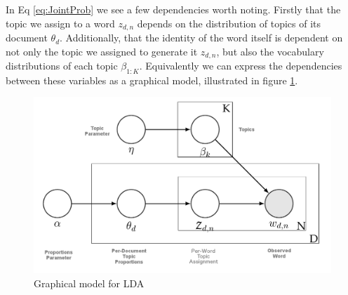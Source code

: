 In Eq \ref{eq:JointProb} we see a few dependencies worth noting. Firstly that the topic we assign to a word $z_{d,n}$ depends on the distribution of topics of its document $\theta_d$. Additionally, that the identity of the word itself is dependent on not only the topic we assigned to generate it $z_{d,n}$, but also the vocabulary distributions of each topic $\beta_{1:K}$. Equivalently we can express the dependencies between these variables as a graphical model, illustrated in figure \ref{fig:Gmod1}.

\begin{figure}[ht]
\centering
\includegraphics[width=130mm,scale=0.45]{Figures/gmod1}
 
  
\caption{Graphical model for LDA}
\label{fig:Gmod1}
\end{figure}

